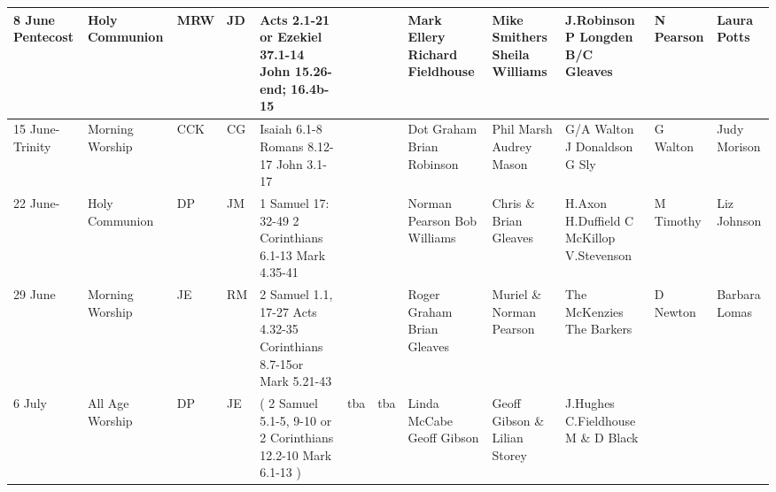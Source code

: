 \documentclass[10pt,a4paper]{article}
\begin{document}
\begin{center}
{\begin{tabular}{|p{1.6cm}|p{1.4cm}|p{1.0cm}|p{0.8cm}|p{3.2cm}|p{2cm}|p{1.5cm}|p{2cm}|p{1.8cm}|p{1.9cm}
|p{2cm}|p{1.6cm}|}
 8 June \linebreak Pentecost & Holy Communion &  MRW & JD & 
 Acts 2.1-21 or Ezekiel 37.1-14
John 15.26-end; 16.4b-15
 &   &  &
Mark Ellery Richard Fieldhouse & Mike Smithers Sheila Williams & 
J.Robinson \linebreak P Longden  B/C Gleaves
  &  N Pearson   & Laura Potts \\ \hline
15 June-  Trinity & Morning Worship   & CCK  & CG  & 
Isaiah 6.1-8
Romans 8.12-17 \linebreak
John 3.1-17
& 
 &  &
Dot Graham Brian Robinson &  Phil Marsh Audrey Mason & 
G/A Walton  \linebreak J Donaldson  \linebreak G Sly
 &  G Walton & Judy \linebreak Morison  \\ 
\hline
22 June-  & Holy Communion & DP  & JM &
1 Samuel 17: 32-49
2 Corinthians 6.1-13
Mark 4.35-41
&   &  & Norman Pearson \linebreak Bob Williams & 
Chris \& Brian Gleaves   & 
 H.Axon  \linebreak H.Duffield   C McKillop    V.Stevenson
&  M Timothy &  Liz Johnson \\
\hline %
29 June & Morning Worship
 & JE & RM & 
2 Samuel 1.1, 17-27 
Acts 4.32-35
\linebreak 2 Corinthians 8.7-15\linebreak or %
Mark 5.21-43
&  
  & 
  & Roger Graham Brian Gleaves & 
Muriel \& Norman Pearson  &
The Mc\-Kenzies The Barkers
 & D Newton & Barbara \linebreak Lomas \\
\hline
6 July & All Age Worship & DP & JE & %
{\footnotesize (
2 Samuel 5.1-5, 9-10 or
2 Corinthians 12.2-10
Mark 6.1-13
)}  &    tba & 
tba & Linda McCabe Geoff Gibson & 
Geoff  Gibson \& Lilian Storey &
J.Hughes \linebreak C.Fieldhouse \linebreak M \& D Black

\end{tabular}}
\end{center}
\end{document}
